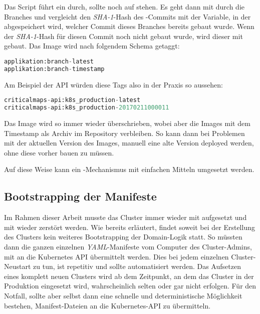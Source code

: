 Das Script führt ein  durch, sollte 
noch auf  stehen.
Es geht dann mit  durch die Branches und vergleicht
den \emph{SHA-1}-Hash
des -Commits mit der  Variable, in der
abgespeichert wird,
welcher Commit dieses Branches bereits gebaut wurde.
Wenn der \emph{SHA-1}-Hash für diesen Commit noch nicht gebaut wurde,
wird dieser mit
 gebaut. Das Image wird
nach folgendem Schema getaggt:
\begin{lstlisting}[language=Python,numbers=none]
applikation:branch-latest
applikation:branch-timestamp
\end{lstlisting}
Am Beispiel der API würden diese Tags also in der Praxis so aussehen:
\begin{lstlisting}[language=Python,numbers=none]
criticalmaps-api:k8s_production-latest
criticalmaps-api:k8s_production-20170211000011
\end{lstlisting}
Das  Image wird so immer wieder überschrieben, wobei aber die Images
mit dem Timestamp als Archiv im Repository verbleiben. So kann dann bei Problemen
mit der aktuellen Version des Images, manuell eine alte Version
deployed werden, ohne diese vorher bauen zu müssen.

Auf diese Weise kann ein -Mechanismus
\cite{duvall}
mit einfachen Mitteln umgesetzt werden.


\subsection{Bootstrapping der Manifeste}

Im Rahmen dieser Arbeit musste das Cluster immer wieder mit 
aufgesetzt und mit  wieder zerstört werden. Wie bereits
erl\"autert, findet soweit bei der Erstellung des Clusters kein weiteres Bootstrapping der
Domain-Logik statt. So m\"ussten dann die ganzen einzelnen
\emph{YAML}-Manifeste vom Computer des Cluster-Admins, mit
 an die Kubernetes API übermittelt
werden. Dies bei jedem einzelnen Cluster-Neustart zu tun, ist repetitiv
und sollte automatisiert werden.
Das Aufsetzen eines komplett neuen Clusters wird ab dem Zeitpunkt, an dem
das Cluster in der Produktion eingesetzt wird, wahrscheinlich selten oder
gar nicht erfolgen. Für den Notfall, sollte aber selbst dann eine schnelle und
deterministische Möglichkeit bestehen, Manifest-Dateien an die Kubernetes-API
zu übermitteln.

